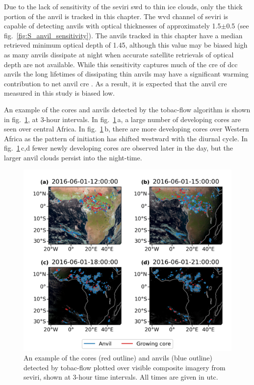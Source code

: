 Due to the lack of sensitivity of the \acrshort{seviri} \acrshort{swd} to thin ice clouds, only the thick portion of the anvil is tracked in this chapter.
The \acrshort{wvd} channel of \acrshort{seviri} is capable of detecting anvils with optical thicknesses of approximately 1.5$\pm$0.5 (see fig.~\ref{fig:S_anvil_sensitivity}).
The anvils tracked in this chapter have a median retrieved minimum optical depth of 1.45, although this value may be biased high as many anvils dissipate at night when accurate satellite retrievals of optical depth are not available.
While this sensitivity captures much of the \acrshort{cre} of \acrshort{dcc} anvils \citep{berry_cloud_2014} the long lifetimes of dissipating thin anvils may have a significant warming contribution to net anvil \acrshort{cre} \citep{horner_evolution_2023}.
As a result, it is expected that the anvil \acrshort{cre} measured in this study is biased low.

An example of the cores and anvils detected by the tobac-flow algorithm is shown in fig.~\ref{fig:seviri_detection}, at 3-hour intervals. 
In fig.~\ref{fig:seviri_detection}\,a, a large number of developing cores are seen over central Africa. 
In fig.~\ref{fig:seviri_detection}\,b, there are more developing cores over Western Africa as the pattern of initiation has shifted westward with the diurnal cycle.
In fig.~\ref{fig:seviri_detection}\,c,d fewer newly developing cores are observed later in the day, but the larger anvil clouds persist into the night-time.


\begin{figure}[tp]
    \includegraphics[width=\textwidth]{figures/chapter4_07.png}
    \caption[
    An example of the cores and anvils (detected by tobac-flow, shown at 3-hour time intervals
    ]{
    An example of the cores (red outline) and anvils (blue outline) detected by tobac-flow plotted over visible composite imagery from \acrshort{seviri}, shown at 3-hour time intervals. All times are given in \acrshort{utc}.
    }
    \label{fig:seviri_detection}
\end{figure}


